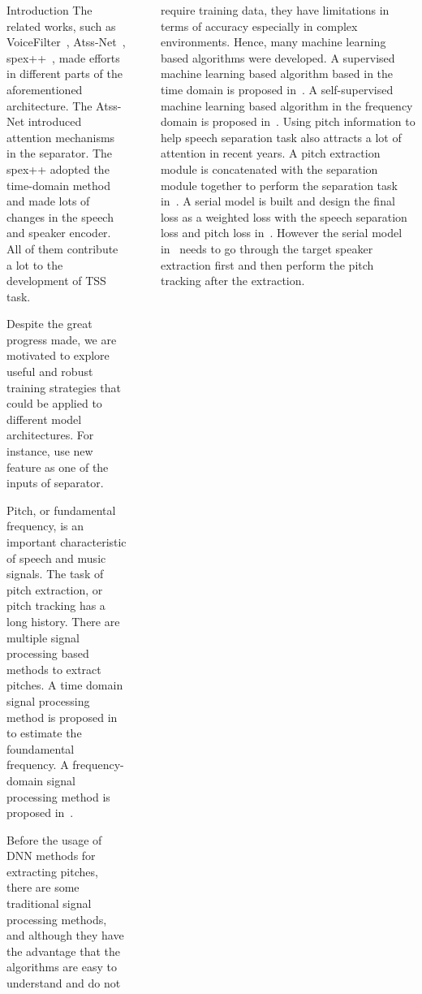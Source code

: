 \documentclass[final]{beamer}
\newlength{\sepwidth}
\newlength{\colwidth}
\newcommand{\separatorcolumn}{\begin{column}{\sepwidth}\end{column}}
\begin{document}
\begin{frame}[t]
\begin{columns}[t]
\begin{column}{\colwidth}
\begin{block}{Introduction}
                    The related works, such as VoiceFilter~\cite{voicefilter}, Atss-Net~\cite{li20p_interspeech}, spex++~\cite{time_domain_speaker_ex_net, spex, spex+}, made efforts in different parts of the aforementioned architecture. The Atss-Net introduced attention mechanisms in the separator. The spex++ adopted the time-domain method and made lots of changes in the speech and speaker encoder. All of them contribute a lot to the development of TSS task.

                    Despite the great progress made, we are motivated to explore useful and robust training strategies that could be applied to different model architectures. For instance, use new feature as one of the inputs of separator.

                    Pitch, or fundamental frequency, is an important characteristic of speech and music signals.
                    The task of pitch extraction, or pitch tracking has a long history. There are multiple signal processing based methods to extract pitches. A time domain signal processing method is proposed in~\cite{yin} to estimate the foundamental frequency.
                    A frequency-domain signal processing method is proposed in~\cite{swipe}.

                    Before the usage of DNN methods for extracting pitches, there are some traditional signal processing methods, and although they have the advantage that the algorithms are easy to understand and do not
                \end{block}

            \end{column}

            \separatorcolumn

            \begin{column}{\colwidth}
                \begin{block}{}
                    require training data, they have limitations in terms of accuracy especially in complex environments. Hence, many machine learning based algorithms were developed.
                    A supervised machine learning based algorithm based in the time domain is proposed in~\cite{crepe}.
                    A self-supervised machine learning based algorithm in the frequency domain is proposed in~\cite{spice}.
                    Using pitch information to help speech separation task also attracts a lot of attention in recent years.
                    A pitch extraction module is concatenated with the separation module together to perform the separation task in~\cite{pitch_aware}.
                    A serial model is built and design the final loss as a weighted loss with the speech separation loss and pitch loss in~\cite{serial}. However the serial model in~\cite{serial} needs to go through the target speaker extraction first and then perform the pitch tracking after the extraction.


\end{block}
\end{column}
\end{columns}
\end{frame}
\end{document}
